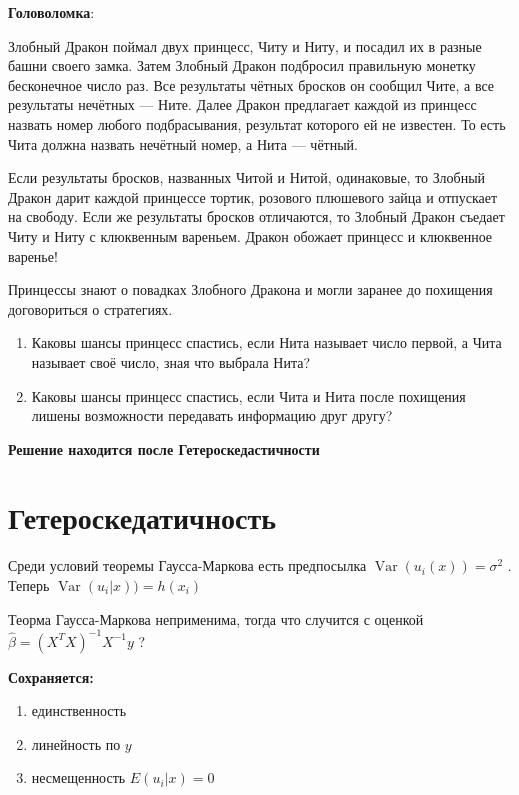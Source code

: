 \documentclass[12pt]{article} %
\theoremstyle{definition} %
\DeclareMathOperator{\Var}{Var}
\begin{document}
\textbf{Головоломка}:
\par Злобный Дракон поймал двух принцесс, Читу и Ниту, и посадил
их в разные башни своего замка. Затем Злобный Дракон подбросил
правильную монетку бесконечное число раз. Все результаты
чётных бросков он сообщил Чите, а все результаты нечётных —
Ните. Далее Дракон предлагает каждой из принцесс назвать номер
любого подбрасывания, результат которого ей не известен. То есть
Чита должна назвать нечётный номер, а Нита — чётный.
\par
Если результаты бросков, названных Читой и Нитой, одинаковые,
то Злобный Дракон дарит каждой принцессе тортик, розового
плюшевого зайца и отпускает на свободу. Если же результаты
бросков отличаются, то Злобный Дракон съедает Читу и Ниту с
клюквенным вареньем. Дракон обожает принцесс и клюквенное
варенье!
\par Принцессы знают о повадках Злобного Дракона и могли заранее до похищения договориться о стратегиях.
\begin{enumerate}
\item{Каковы шансы принцесс спастись, если Нита называет число
первой, а Чита называет своё число, зная что выбрала Нита?}
\item{Каковы шансы принцесс спастись, если Чита и Нита после
похищения лишены возможности передавать информацию
друг другу?}
\end{enumerate}
\par\textbf{Решение находится после Гетероскедастичности}

\section{Гетероскедатичность}

Среди условий теоремы Гаусса-Маркова есть предпосылка $\Var(u_i(x)) = \sigma ^2 $ . Теперь  $\Var(u_i | x)) = h(x_i)$ 

Теорма Гаусса-Маркова неприменима, тогда что случится с оценкой $\hat{\beta}  = (X^T X)^{-1} X^{-1} y$   ? 
  
\textbf{Сохраняется:}

\begin{enumerate}
\item единственность
\item линейность по $y$
\item несмещенность $E(u_i |x) = 0$
\end{enumerate}

\par
\end{document}
